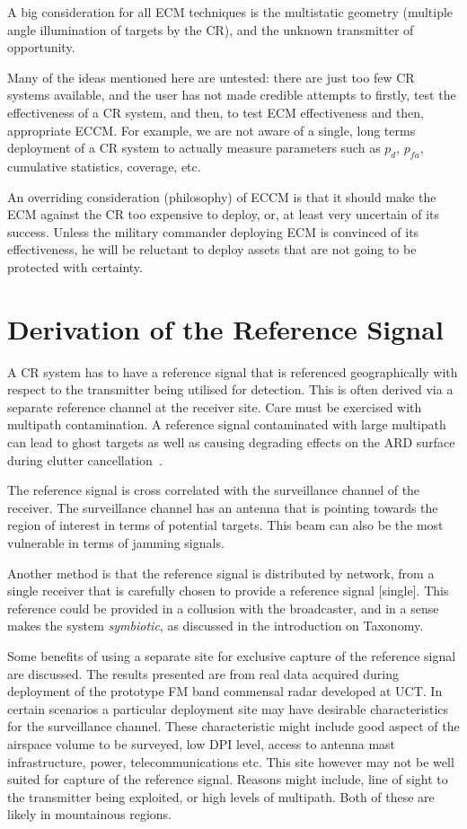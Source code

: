 \documentclass[english, 12pt]{report}
\begin{document}
A big consideration for all ECM techniques is the multistatic geometry (multiple angle illumination of targets by the CR), and the unknown transmitter of opportunity.

Many of the ideas mentioned here are untested: there are just too few CR systems available, and the user has not made credible attempts to firstly, test the effectiveness of a CR system, and then, to test ECM effectiveness and then, appropriate ECCM. For example, we are not aware of a single, long terms deployment of a CR system to actually measure parameters such as $p_d$, $p_{fa}$, cumulative statistics, coverage, etc.

An overriding consideration (philosophy) of ECCM is that it should make the ECM against the CR too expensive to deploy, or, at least very uncertain of its success. Unless the military commander deploying ECM is convinced of its effectiveness, he will be reluctant to deploy assets that are not going to be protected with certainty.

\section{Derivation of the Reference Signal}

A CR system has to have a reference signal that is referenced geographically with respect to the transmitter being utilised for detection. This is often derived via a separate reference channel at the receiver site. Care must be exercised with multipath contamination. A reference signal contaminated with large multipath can lead to ghost targets as well as causing degrading effects on the ARD surface during clutter cancellation~\cite{UCT_SepRefResults:2013}.

The reference signal is cross correlated with the surveillance channel of the receiver. The surveillance channel has an antenna that is pointing towards the region of interest in terms of potential targets. This beam  can also be the most vulnerable in terms of jamming signals.

Another method is that the reference signal is distributed by network, from a single receiver that is carefully chosen to provide a reference signal [single]. This reference could be provided in a collusion with the broadcaster, and in a sense makes the system \emph{symbiotic}, as discussed in the introduction on Taxonomy.

Some benefits of using a separate site for exclusive capture of the reference signal are discussed. The results presented are from real data acquired during deployment of the prototype FM band commensal radar developed at UCT. In certain scenarios a particular deployment site may have desirable characteristics for the surveillance channel. These characteristic might include good aspect of the airspace volume to be surveyed, low DPI level, access to antenna mast infrastructure, power, telecommunications etc. This site however may not be well suited for capture of the reference signal. Reasons might include, line of sight to the transmitter being exploited, or high levels of multipath. Both of these are likely in mountainous regions.
\end{document}
